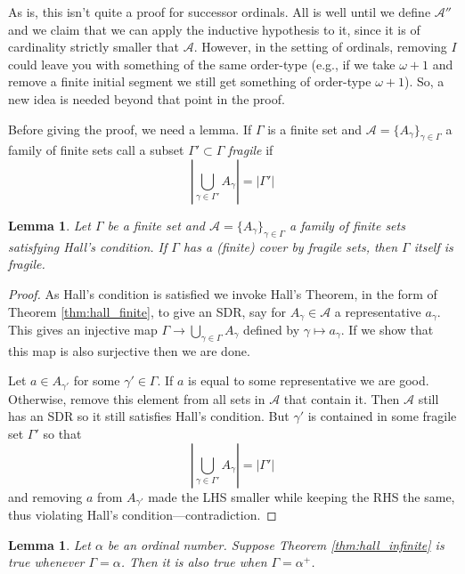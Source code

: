 \documentclass{article}
\theoremstyle{definition}
\theoremstyle{plain}
\newtheorem{lem}[thm]{Lemma}
\theoremstyle{definition}
\begin{document}
	As is, this isn't quite a proof for successor ordinals. All is well until we define $\mathcal{A}''$ and we claim that we can apply the inductive hypothesis to it, since it is of cardinality strictly smaller that $\mathcal{A}$. However, in the setting of ordinals, removing $I$ could leave you with something of the same order-type (e.g., if we take $\omega + 1$ and remove a finite initial segment we still get something of order-type $\omega + 1$). So, a new idea is needed beyond that point in the proof.
	
	Before giving the proof, we need a lemma. If $\Gamma$ is a finite set and $\mathcal{A} = \{A_\gamma\}_{\gamma\in \Gamma}$ a family of finite sets call a subset $\Gamma'\subset \Gamma$ \emph{fragile} if 
	\[
		\left|\bigcup_{\gamma \in \Gamma'}A_\gamma\right| = |\Gamma'|
	\]
	\begin{lem}\label{lem:fragile}
		Let $\Gamma$ be a finite set and $\mathcal{A} = \{A_\gamma\}_{\gamma \in \Gamma}$ a family of finite sets satisfying Hall's condition. If $\Gamma$ has a (finite) cover by fragile sets, then $\Gamma$ itself is fragile.
	\end{lem}
	\begin{proof}
		As Hall's condition is satisfied we invoke Hall's Theorem, in the form of Theorem \ref{thm:hall_finite}, to give an SDR, say for $A_\gamma\in\mathcal{A}$ a representative $a_\gamma$. This gives an injective map $\Gamma \to \bigcup_{\gamma \in \Gamma} A_\gamma$ defined by $\gamma \mapsto a_\gamma$. If we show that this map is also surjective then we are done.
		
		Let $a\in A_{\gamma'}$ for some $\gamma'\in \Gamma$. If $a$ is equal to some representative we are good. Otherwise, remove this element from all sets in $\mathcal{A}$ that contain it. Then $\mathcal{A}$ still has an SDR so it still satisfies Hall's condition. But $\gamma'$ is contained in some fragile set $\Gamma'$ so that 
		\[
			\left|\bigcup_{\gamma \in \Gamma'}A_\gamma\right| = |\Gamma'|
		\]
		and removing $a$ from $A_{\gamma'}$ made the LHS smaller while keeping the RHS the same, thus violating Hall's condition---contradiction.
	\end{proof}
	\begin{lem}
		Let $\alpha$ be an ordinal number. Suppose Theorem \ref{thm:hall_infinite} is true whenever $\Gamma = \alpha$. Then it is also true when $\Gamma = \alpha^{+}$.
	\end{lem}
\end{document}
